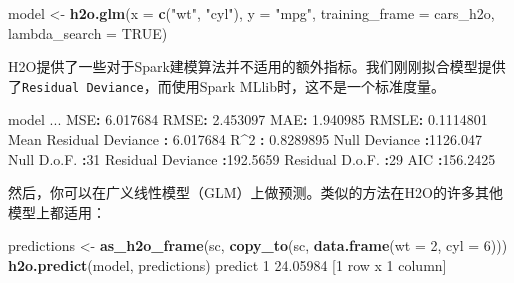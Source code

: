 \documentclass[
]{article}
\newenvironment{Shaded}{\begin{snugshade}}{\end{snugshade}}
\newcommand{\DataTypeTok}[1]{\textcolor[rgb]{0.13,0.29,0.53}{#1}}
\newcommand{\DecValTok}[1]{\textcolor[rgb]{0.00,0.00,0.81}{#1}}
\newcommand{\FloatTok}[1]{\textcolor[rgb]{0.00,0.00,0.81}{#1}}
\newcommand{\KeywordTok}[1]{\textcolor[rgb]{0.13,0.29,0.53}{\textbf{#1}}}
\newcommand{\NormalTok}[1]{#1}
\newcommand{\OperatorTok}[1]{\textcolor[rgb]{0.81,0.36,0.00}{\textbf{#1}}}
\newcommand{\OtherTok}[1]{\textcolor[rgb]{0.56,0.35,0.01}{#1}}
\newcommand{\StringTok}[1]{\textcolor[rgb]{0.31,0.60,0.02}{#1}}
\begin{document}
\begin{Shaded}
\begin{Highlighting}[]
\NormalTok{model <-}\StringTok{ }\KeywordTok{h2o.glm}\NormalTok{(}\DataTypeTok{x =} \KeywordTok{c}\NormalTok{(}\StringTok{"wt"}\NormalTok{, }\StringTok{"cyl"}\NormalTok{), }\DataTypeTok{y =} \StringTok{"mpg"}\NormalTok{, }\DataTypeTok{training_frame =}\NormalTok{ cars_h2o, }\DataTypeTok{lambda_search =} \OtherTok{TRUE}\NormalTok{)}
\end{Highlighting}
\end{Shaded}

H2O提供了一些对于Spark建模算法并不适用的额外指标。我们刚刚拟合模型提供了\texttt{Residual\ Deviance}，而使用Spark
MLlib时，这不是一个标准度量。

\begin{Shaded}
\begin{Highlighting}[]
\NormalTok{model}
\NormalTok{...}
\NormalTok{MSE}\OperatorTok{:}\StringTok{ }\FloatTok{6.017684}
\NormalTok{RMSE}\OperatorTok{:}\StringTok{ }\FloatTok{2.453097}
\NormalTok{MAE}\OperatorTok{:}\StringTok{ }\FloatTok{1.940985}
\NormalTok{RMSLE}\OperatorTok{:}\StringTok{ }\FloatTok{0.1114801}
\NormalTok{Mean Residual Deviance }\OperatorTok{:}\StringTok{ }\FloatTok{6.017684}
\NormalTok{R}\OperatorTok{^}\DecValTok{2} \OperatorTok{:}\StringTok{ }\FloatTok{0.8289895}
\NormalTok{Null Deviance }\OperatorTok{:}\FloatTok{1126.047}
\NormalTok{Null D.o.F. }\OperatorTok{:}\DecValTok{31}
\NormalTok{Residual Deviance }\OperatorTok{:}\FloatTok{192.5659}
\NormalTok{Residual D.o.F. }\OperatorTok{:}\DecValTok{29}
\NormalTok{AIC }\OperatorTok{:}\FloatTok{156.2425}
\end{Highlighting}
\end{Shaded}

然后，你可以在广义线性模型（GLM）上做预测。类似的方法在H2O的许多其他模型上都适用：

\begin{Shaded}
\begin{Highlighting}[]
\NormalTok{predictions <-}\StringTok{ }\KeywordTok{as_h2o_frame}\NormalTok{(sc, }\KeywordTok{copy_to}\NormalTok{(sc, }\KeywordTok{data.frame}\NormalTok{(}\DataTypeTok{wt =} \DecValTok{2}\NormalTok{, }\DataTypeTok{cyl =} \DecValTok{6}\NormalTok{)))}
\KeywordTok{h2o.predict}\NormalTok{(model, predictions)}
\NormalTok{ predict}
\DecValTok{1} \FloatTok{24.05984}
\NormalTok{[}\DecValTok{1}\NormalTok{ row x }\DecValTok{1}\NormalTok{ column]}
\end{Highlighting}
\end{Shaded}
\end{document}
